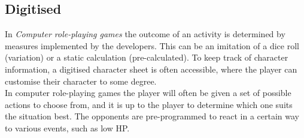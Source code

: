 \subsection{Digitised}
In \emph{Computer role-playing games} the outcome of an activity is determined by measures implemented by the developers. This can be an imitation of a dice roll (variation) or a static calculation (pre-calculated).
To keep track of character information, a digitised character sheet is often accessible, where the player can customise their character to some degree.\\
In computer role-playing games the player will often be given a set of possible actions to choose from, and it is up to the player to determine which one suits the situation best. The opponents are pre-programmed to react in a certain way to various events, such as low HP.

\pagebreak

